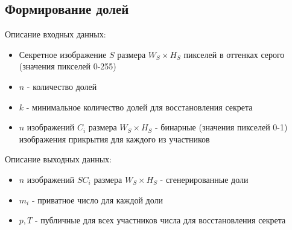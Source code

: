 \documentclass[a4paper,article,14pt]{extarticle}
\begin{document}
\subsection{Формирование долей}
Описание входных данных:

\begin{itemize}
    \setlength{\itemindent}{3em}
    \item Секретное изображение $S$ размера $W_S \times H_S$ пикселей в оттенках серого (значения пикселей 0-255)
    \item $n$ - количество долей
    \item $k$ - минимальное количество долей для восстановления секрета
    \item $n$ изображений $C_i$ размера $W_S \times H_S$ - бинарные (значения пикселей 0-1) изображения прикрытия для каждого из участников
\end{itemize}

Описание выходных данных:

\begin{itemize}
    \setlength{\itemindent}{3em}
    \item $n$ изображений $SC_i$ размера $W_S \times H_S$ - сгенерированные доли
    \item $m_i$ - приватное число для каждой доли
    \item $p, T$ - публичные для всех участников числа для восстановления секрета
\end{itemize}
\end{document}
